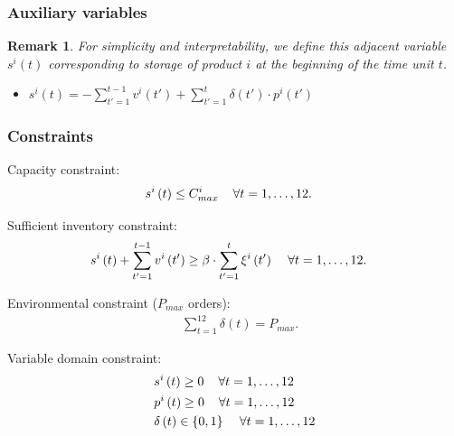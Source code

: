 \documentclass[11pt,twocolumn]{article}
\newtheorem{remark}{Remark}{}
\begin{document}
\subsubsection{Auxiliary variables}

\begin{remark}
	For simplicity and interpretability, we define this adjacent variable $s^{i}\left( t \right) $ corresponding to storage of product $i$ at the beginning of the time unit $t$.
\end{remark}

\begin{itemize}
	\item $s^{i}\left( t \right) = - \sum_{t'=1}^{t-1} v^{i}\left( t' \right)  + \sum_{t'=1}^{t} \delta\left( t' \right) \cdot p^{i}\left( t' \right)  $
\end{itemize}

\subsubsection{Constraints}

Capacity constraint:
\begin{align*}
	 & s^{i}\left( t \right) \le C^{i}_{max} \hspace{4mm} \forall t = 1,\ldots,12
	.\end{align*}

Sufficient inventory constraint:
\begin{align*}
	 & s^{i}\left( t \right) + \sum_{t'=1}^{t-1} v^{i}\left( t' \right) \ge \beta\cdot \sum_{t'=1}^{t} \xi^{i}\left( t' \right) \hspace{4mm} \forall t = 1,\ldots,12
	.\end{align*}


Environmental constraint ($P_{max}$ orders):
\begin{align*}
	 & \sum_{t=1}^{12} \delta\left( t \right) = P_{max}
	.\end{align*}

Variable domain constraint:
\begin{align*}
	 & s^{i}\left( t \right) \ge 0 \hspace{4mm} \forall t = 1,\ldots,12                       \\
	 & p^{i}\left( t \right) \ge 0 \hspace{4mm} \forall t = 1,\ldots,12                       \\
	 & \delta \left( t \right) \in  \left\{ 0,1 \right\} \hspace{4mm} \forall t = 1,\ldots,12
\end{align*}
\end{document}

